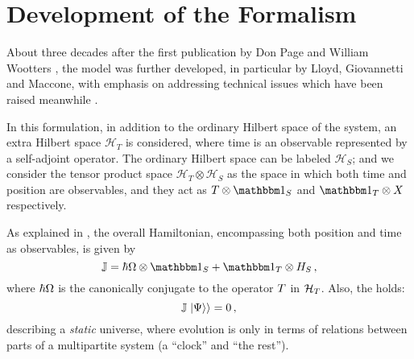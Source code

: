 \section{Development of the Formalism}\label{sec:pw:formalism}\label{sec:pw:theory_first}

About three decades after the first publication by
Don Page and William Wootters \parencite{PageWootters},
the model was further developed,
in particular by Lloyd, Giovannetti and Maccone,
with emphasis on addressing technical issues which have been raised meanwhile
\parencite{Lloyd:Time}.

In this formulation,
in addition to the ordinary Hilbert space of the system,
an extra Hilbert space $\mathcal{H}_T$ is considered,
where time is an observable
represented by a self-adjoint operator.
The ordinary Hilbert space can be labeled $\mathcal{H}_S$;
and we consider the tensor product space $\mathcal{H}_T \otimes \mathcal{H}_S$ as
the space in which both time and position are observables, and they act as
$T \otimes \idop_S$ and $\idop_T \otimes X$
respectively.

As explained in \cite{Lloyd:Time, Maccone:Pauli}, the overall Hamiltonian,
encompassing both position and time as observables, is given by
\begin{equation}\label{eq:pwHamiltonian}
  \op{\mathbb{J}} = \hbar\op{\Omega}\ox\idop_S + \idop_T\ox\op{H}_S \,\text{,}
\end{equation}
where $\hbar{\Omega}$ is the canonically conjugate to the operator ${T}$ in $\mathcal{H}_T$.
Also, the  holds:
\begin{equation}\label{eq:Wheeler-DeWitt}
  {\mathbb{J}}\left.\left| \Psi \right\rangle\right\rangle = 0 \,\text{,}
\end{equation}
describing a \emph{static} universe, where evolution is only
in terms of relations between parts of a multipartite system
(a ``clock'' and ``the rest'').


